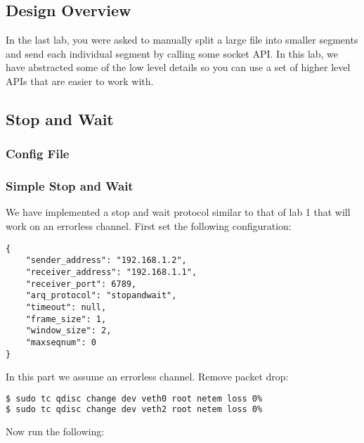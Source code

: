 \documentclass[11pt]{article}
\begin{document}
\subsection{Design Overview}
In the last lab, you were asked to manually split a large file into smaller segments and send each individual segment by calling some socket API. In this lab, we have abstracted some of the low level details so you can use a set of higher level APIs that are easier to work with.

\subsection{Stop and Wait}
\subsubsection{Config File}


\subsubsection{Simple Stop and Wait}
We have implemented a stop and wait protocol similar to that of lab 1 that will work on an errorless channel. First set the following configuration:

\begin{minipage}{\linewidth}
\begin{lstlisting}[caption={Configuration For Small File}]
{
    "sender_address": "192.168.1.2",
    "receiver_address": "192.168.1.1",
    "receiver_port": 6789,
    "arq_protocol": "stopandwait",
    "timeout": null,
    "frame_size": 1,
    "window_size": 2,
    "maxseqnum": 0
}
\end{lstlisting}
\end{minipage}

In this part we assume an errorless channel. Remove packet drop:
\begin{lstlisting}[language=bash]
$ sudo tc qdisc change dev veth0 root netem loss 0%
$ sudo tc qdisc change dev veth2 root netem loss 0%
\end{lstlisting}
Now run the following:
\end{document}
